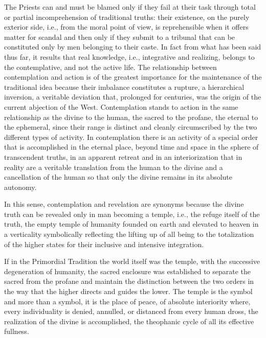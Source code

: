 The Priests can and must be blamed only if they fail at their task through total or partial incomprehension of traditional truths: their existence, on the purely exterior side, i.e., from the moral point of view, is reprehensible when it offers matter for scandal and then only if they submit to a tribunal that can be constituted only by men belonging to their caste. In fact from what has been said thus far, it results that real knowledge, i.e., integrative and realizing, belongs to the contemplative, and not the active life. The relationship between contemplation and action is of the greatest importance for the maintenance of the traditional idea because their imbalance constitutes a rupture, a hierarchical inversion, a veritable deviation that, prolonged for centuries, was the origin of the current abjection of the West. Contemplation stands to action in the same relationship as the divine to the human, the sacred to the profane, the eternal to the ephemeral, since their range is distinct and cleanly circumscribed by the two different types of activity. In contemplation there is an activity of a special order that is accomplished in the eternal place, beyond time and space in the sphere of transcendent truths, in an apparent retreat and in an interiorization that in reality are a veritable translation from the human to the divine and a cancellation of the human so that only the divine remains in its absolute autonomy.

In this sense, contemplation and revelation are synonyms because the divine truth can be revealed only in man becoming a temple, i.e., the refuge itself of the truth, the empty temple of humanity founded on earth and elevated to heaven in a verticality symbolically reflecting the lifting up of all being to the totalization of the higher states for their inclusive and intensive integration.

If in the Primordial Tradition the world itself was the temple, with the successive degeneration of humanity, the sacred enclosure was established to separate the sacred from the profane and maintain the distinction between the two orders in the way that the higher directs and guides the lower. The temple is the symbol and more than a symbol, it is the place of peace, of absolute interiority where, every individuality is denied, annulled, or distanced from every human dross, the realization of the divine is accomplished, the theophanic cycle of all its effective fullness.

